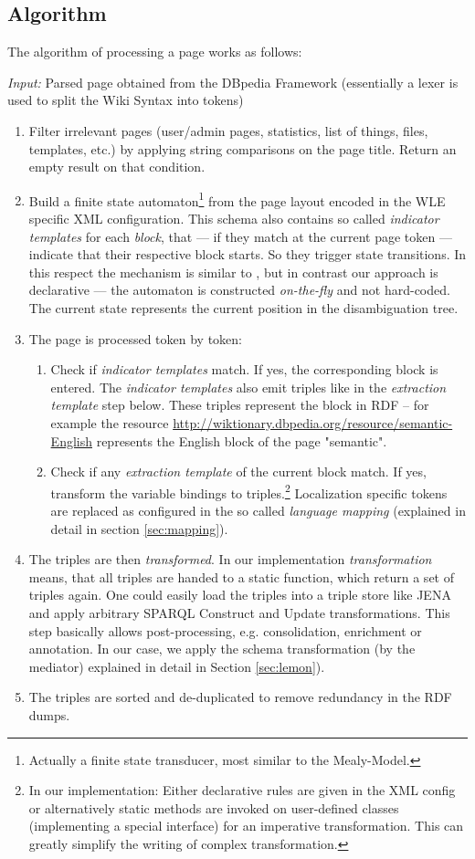 \subsection{Algorithm}
The algorithm of processing a page works as follows:

\textit{Input:} Parsed page obtained from the DBpedia Framework (essentially a lexer is used to split the Wiki Syntax into tokens)
\begin{enumerate}
\item Filter irrelevant pages (user/admin pages, statistics, list of things, files, templates, etc.) by applying string comparisons on the page title. Return an empty result on that condition.
\item Build a finite state automaton\footnote{Actually a finite state transducer, most similar to the Mealy-Model.} from the page layout encoded in the WLE specific XML configuration. This schema also contains so called \textit{indicator templates} for each \textit{block}, that --- if they match at the current page token --- indicate that their respective block starts. 
So they trigger state transitions. In this respect the mechanism is similar to \cite{McCrae_2012}, but in contrast our approach is declarative --- the automaton is constructed \textit{on-the-fly} and not hard-coded. 
The current state represents the current position in the disambiguation tree.
\item The page is processed token by token:
\begin{enumerate}
\item Check if \textit{indicator templates} match. 
If yes, the corresponding block is entered. 
The \textit{indicator templates} also emit triples like in the \textit{extraction template} step below. 
These triples represent the block in RDF -- for example the resource \url{http://wiktionary.dbpedia.org/resource/semantic-English} represents the English block of the page "semantic".
\item Check if any \textit{extraction template} of the current block match.
\subitem If yes, transform the variable bindings to triples.\footnote{In our implementation: 
Either declarative rules are given in the XML config or alternatively static methods are invoked on user-defined classes (implementing a special interface) for an imperative transformation. This can greatly simplify the writing of complex transformation.} Localization specific tokens are replaced as configured in the so called \textit{language mapping} (explained in detail in section \ref{sec:mapping}).
\end{enumerate}
\item The triples are then \textit{transformed}. In our implementation \textit{transformation} means, that all triples are handed to a static function, which return a set of triples again. One could easily load the triples into a triple store like JENA and apply arbitrary SPARQL Construct and Update transformations. 
This step basically allows post-processing, e.g. consolidation, enrichment or annotation. 
In our case, we apply the schema transformation (by the mediator) explained in detail in Section \ref{sec:lemon}).
\item The triples are sorted and de-duplicated to remove redundancy in the RDF dumps.
\end{enumerate}
